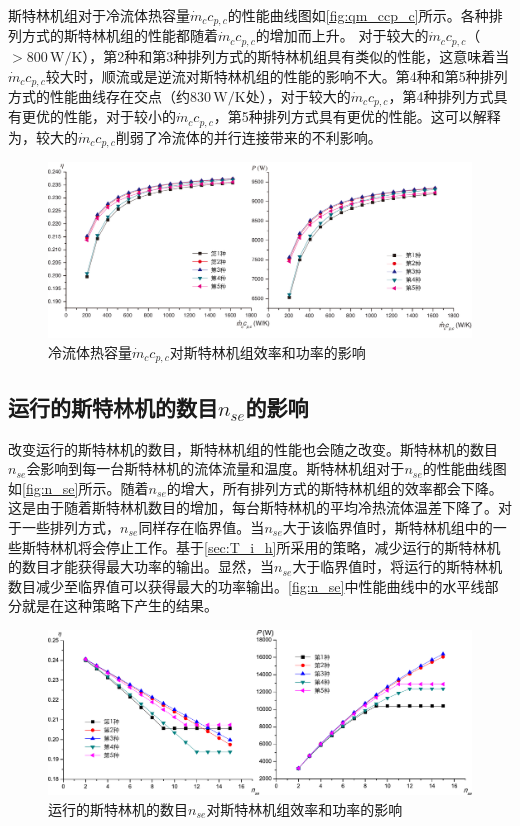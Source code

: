 斯特林机组对于冷流体热容量$\dot{m}_cc_{p,c}$的性能曲线图如\autoref{fig:qm_ccp_c}所示。各种排列方式的斯特林机组的性能都随着$\dot{m}_cc_{p,c}$的增加而上升。
对于较大的$\dot{m}_cc_{p,c}$（$> 800\,\mathrm{W/K}$），第2种和第3种排列方式的斯特林机组具有类似的性能，这意味着当$\dot{m}_cc_{p,c}$较大时，顺流或是逆流对斯特林机组的性能的影响不大。第4种和第5种排列方式的性能曲线存在交点（约$830\,\mathrm{W/K}$处），对于较大的$\dot{m}_cc_{p,c}$，第4种排列方式具有更优的性能，对于较小的$\dot{m}_cc_{p,c}$，第5种排列方式具有更优的性能。这可以解释为，较大的$\dot{m}_cc_{p,c}$削弱了冷流体的并行连接带来的不利影响。
\begin{figure}[htbp]
\centering
	\includegraphics[width = 0.95\columnwidth]{fig/qm_ccp_c}
	\caption{冷流体热容量$\dot{m}_cc_{p,c}$对斯特林机组效率和功率的影响}
	\label{fig:qm_ccp_c}
\end{figure}

\subsection{运行的斯特林机的数目$n_{se}$的影响}

改变运行的斯特林机的数目，斯特林机组的性能也会随之改变。斯特林机的数目$n_{se}$会影响到每一台斯特林机的流体流量和温度。斯特林机组对于$n_{se}$的性能曲线图如\autoref{fig:n_se}所示。随着$n_{se}$的增大，所有排列方式的斯特林机组的效率都会下降。这是由于随着斯特林机数目的增加，每台斯特林机的平均冷热流体温差下降了。对于一些排列方式，$n_{se}$同样存在临界值。当$n_{se}$大于该临界值时，斯特林机组中的一些斯特林机将会停止工作。基于\autoref{sec:T_i_h}所采用的策略，减少运行的斯特林机的数目才能获得最大功率的输出。显然，当$n_{se}$大于临界值时，将运行的斯特林机数目减少至临界值可以获得最大的功率输出。\autoref{fig:n_se}中性能曲线中的水平线部分就是在这种策略下产生的结果。

\begin{figure}[htbp]
	\centering
	\includegraphics[width = 0.95\columnwidth]{fig/n_se}
	\caption{运行的斯特林机的数目$n_{se}$对斯特林机组效率和功率的影响}
	\label{fig:n_se}
\end{figure}

